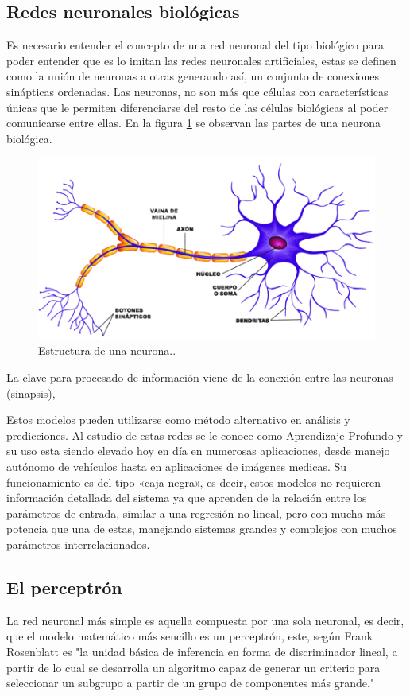 \documentclass[12pt,letterpaper,oneside,openright]{book}
\begin{document}
	\subsection{Redes neuronales biológicas}
	Es necesario entender el concepto de una red neuronal del tipo biológico para poder entender que es lo imitan las redes neuronales artificiales, estas se definen como la unión de neuronas a otras generando así, un conjunto de conexiones sinápticas ordenadas. Las neuronas, no son más que células con características únicas que le permiten diferenciarse del resto de las células biológicas al poder comunicarse entre ellas. En la figura \ref{fig:neurona} se observan las partes de una neurona biológica. 
	\begin{figure}[h]
		\centering
		\includegraphics[width=0.6\linewidth]{Sem_1/figuras/neurona}
		\caption{Estructura de una neurona.\cite{imaNeu}.}
		\label{fig:neurona}
	\end{figure}
	
	La clave para procesado de información viene de la conexión entre las neuronas (sinapsis), 
	
	Estos modelos pueden utilizarse como método alternativo en análisis y predicciones. Al estudio de estas redes se le conoce como Aprendizaje Profundo y su uso esta siendo elevado hoy en día en numerosas aplicaciones, desde manejo autónomo de vehículos hasta en aplicaciones de imágenes medicas. Su funcionamiento es del tipo «caja negra», es decir, estos modelos no requieren información detallada del sistema ya que aprenden de la relación entre los parámetros de entrada, similar a una regresión no lineal, pero con mucha más potencia que una de estas, manejando sistemas grandes y complejos con muchos parámetros interrelacionados.
	\subsection{El perceptrón}
	La red neuronal más simple es aquella compuesta por una sola neuronal, es decir, que el modelo matemático más sencillo es un perceptrón, este, según Frank Rosenblatt \cite{perceptron} es "la unidad básica de inferencia en forma de discriminador lineal, a partir de lo cual se desarrolla un algoritmo capaz de generar un criterio para seleccionar un subgrupo a partir de un grupo de componentes más grande."
\end{document}
